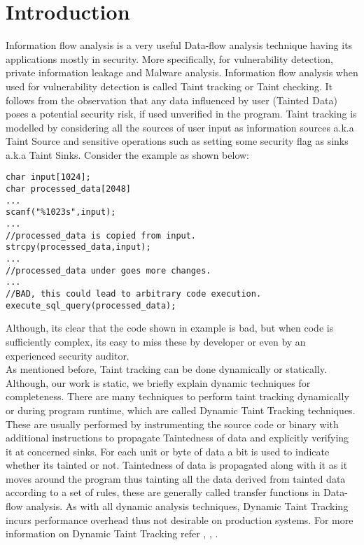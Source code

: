 \documentclass[11pt, pdftex]{article}
\begin{document}
\section{Introduction}
Information flow analysis is a very useful Data-flow analysis technique having its applications mostly in security. More specifically, for vulnerability detection, private information leakage and Malware analysis. Information flow analysis when used for vulnerability detection is called Taint tracking or Taint checking. It follows from the observation that any data influenced by user (Tainted Data) poses a potential security risk, if used unverified in the program. Taint tracking is modelled by considering all the sources of user input as information sources a.k.a Taint Source and sensitive operations such as setting some security flag as sinks a.k.a Taint Sinks. Consider the example as shown below:
\begin{lstlisting}
char input[1024];
char processed_data[2048]
...
scanf("%1023s",input);
...
//processed_data is copied from input.
strcpy(processed_data,input);
...
//processed_data under goes more changes.
...
//BAD, this could lead to arbitrary code execution.
execute_sql_query(processed_data);
\end{lstlisting}
Although, its clear that the code shown in example is bad, but when code is sufficiently complex, its easy to miss these by developer or even by an experienced security auditor.\\ 
As mentioned before, Taint tracking can be done dynamically or statically. Although, our work is static, we briefly explain dynamic techniques for completeness. There are many techniques to perform taint tracking dynamically or during program runtime, which are called Dynamic Taint Tracking techniques. These are usually performed by instrumenting the source code or binary with additional instructions to propagate Taintedness of data and explicitly verifying it at concerned sinks. For each unit or byte of data a bit is used to indicate whether its tainted or not. Taintedness of data is propagated along with it as it moves around the program thus tainting all the data derived from tainted data according to a set of rules, these are generally called transfer functions in Data-flow analysis. As with all dynamic analysis techniques, Dynamic Taint Tracking incurs performance overhead thus not desirable on production systems. For more information on Dynamic Taint Tracking refer \cite{schwartz2010all}, \cite{enck2014taintdroid}, \cite{newsome2005dynamic}.\\
\end{document}
